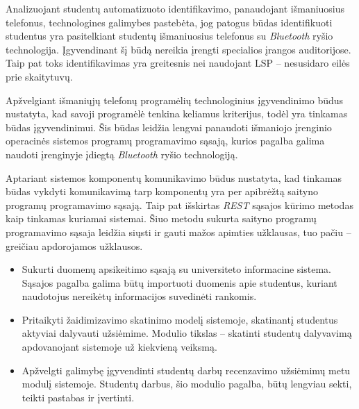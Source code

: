 \documentclass{VUMIFPSkursinis}
\begin{document}
Analizuojant studentų automatizuoto identifikavimo, panaudojant išmaniuosius telefonus, technologines galimybes pastebėta, jog patogus būdas identifikuoti studentus yra pasitelkiant studentų išmaniuosius telefonus su \textit{Bluetooth} ryšio technologija. Įgyvendinant šį būdą nereikia įrengti specialios įrangos auditorijose. Taip pat toks identifikavimas yra greitesnis nei naudojant LSP – nesusidaro eilės prie skaitytuvų.

Apžvelgiant išmaniųjų telefonų programėlių technologinius įgyvendinimo būdus nustatyta, kad savoji programėlė tenkina keliamus kriterijus, todėl yra tinkamas būdas įgyvendinimui. Šis būdas leidžia lengvai panaudoti išmaniojo įrenginio operacinės sistemos programų programavimo sąsają, kurios pagalba galima naudoti įrenginyje įdiegtą \textit{Bluetooth} ryšio technologiją.

Aptariant sistemos komponentų komunikavimo būdus nustatyta, kad tinkamas būdas vykdyti komunikavimą tarp komponentų yra per apibrėžtą saityno programų programavimo sąsają. Taip pat išskirtas \textit{REST} sąsajos kūrimo metodas kaip tinkamas kuriamai sistemai. Šiuo metodu sukurta saityno programų programavimo sąsaja leidžia siųsti ir gauti mažos apimties užklausas, tuo pačiu – greičiau apdorojamos užklausos.


\begin{itemize}
	\item Sukurti duomenų apsikeitimo sąsają su universiteto informacine sistema. Sąsajos pagalba galima būtų importuoti duomenis apie studentus, kuriant naudotojus nereikėtų informacijos suvedinėti rankomis.
	\item Pritaikyti žaidimizavimo skatinimo modelį sistemoje, skatinantį studentus aktyviai dalyvauti užsiėmime. Modulio tikslas – skatinti studentų dalyvavimą apdovanojant sistemoje už kiekvieną veiksmą.
	\item Apžvelgti galimybę įgyvendinti studentų darbų recenzavimo užsiėmimų metu modulį sistemoje. Studentų darbus, šio modulio pagalba, būtų lengviau sekti, teikti pastabas ir įvertinti. 
\end{itemize}

\printbibliography[heading=bibintoc]  %


\end{document}
